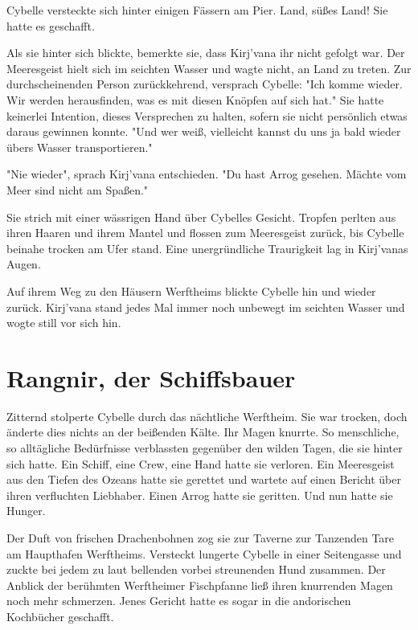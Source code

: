 Cybelle versteckte sich hinter einigen Fässern am Pier. Land, süßes Land! Sie hatte es geschafft.

Als sie hinter sich blickte, bemerkte sie, dass Kirj'vana ihr nicht gefolgt war. Der Meeresgeist hielt sich im seichten Wasser und wagte nicht, an Land zu treten. Zur durchscheinenden Person zurückkehrend, versprach Cybelle: "Ich komme wieder. Wir werden herausfinden, was es mit diesen Knöpfen auf sich hat." Sie hatte keinerlei Intention, dieses Versprechen zu halten, sofern sie nicht persönlich etwas daraus gewinnen konnte. "Und wer weiß, vielleicht kannst du uns ja bald wieder übers Wasser transportieren."

"Nie wieder", sprach Kirj'vana entschieden. "Du hast Arrog gesehen. Mächte vom Meer sind nicht am Spaßen."

Sie strich mit einer wässrigen Hand über Cybelles Gesicht. Tropfen perlten aus ihren Haaren und ihrem Mantel und flossen zum Meeresgeist zurück, bis Cybelle beinahe trocken am Ufer stand. Eine unergründliche Traurigkeit lag in Kirj'vanas Augen.

Auf ihrem Weg zu den Häusern Werftheims blickte Cybelle hin und wieder zurück. Kirj'vana stand jedes Mal immer noch unbewegt im seichten Wasser und wogte still vor sich hin.





\newpage
\section{Rangnir, der Schiffsbauer}

Zitternd stolperte Cybelle durch das nächtliche Werftheim. Sie war trocken, doch änderte dies nichts an der beißenden Kälte. Ihr Magen knurrte. So menschliche, so alltägliche Bedürfnisse verblassten gegenüber den wilden Tagen, die sie hinter sich hatte. Ein Schiff, eine Crew, eine Hand hatte sie verloren. Ein Meeresgeist aus den Tiefen des Ozeans hatte sie gerettet und wartete auf einen Bericht über ihren verfluchten Liebhaber. Einen Arrog hatte sie geritten. Und nun hatte sie Hunger.

Der Duft von frischen Drachenbohnen zog sie zur Taverne zur Tanzenden Tare am Haupthafen Werftheims. Versteckt lungerte Cybelle in einer Seitengasse und zuckte bei jedem zu laut bellenden vorbei streunenden Hund zusammen. Der Anblick der berühmten Werftheimer Fischpfanne ließ ihren knurrenden Magen noch mehr schmerzen. Jenes Gericht hatte es sogar in die andorischen Kochbücher geschafft.

